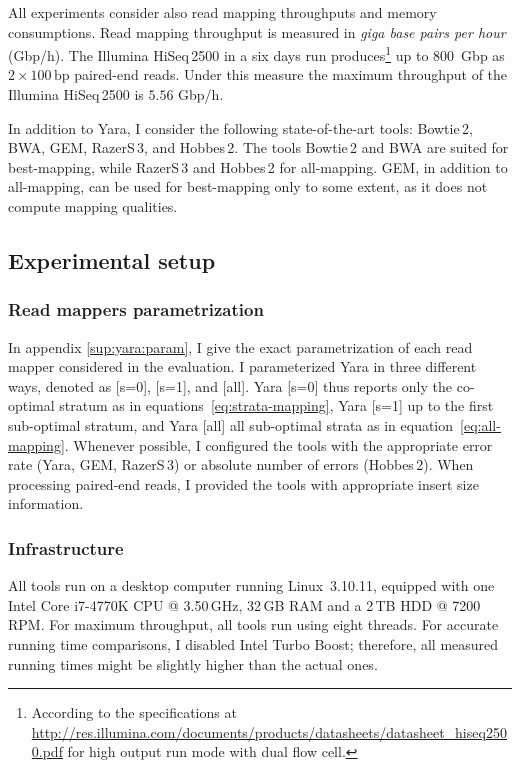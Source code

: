 All experiments consider also read mapping throughputs and memory consumptions.
Read mapping throughput is measured in \emph{giga base pairs per hour} (Gbp/h).
The Illumina HiSeq\,2500 in a six days run produces\footnote{According to the specifications at \url{http://res.illumina.com/documents/products/datasheets/datasheet_hiseq2500.pdf} for high output run mode with dual flow cell.} up to 800~Gbp as $2 \times 100\,\text{bp}$ paired-end reads.
Under this measure the maximum throughput of the Illumina HiSeq\,2500 is $5.56$ Gbp/h.

In addition to Yara, I consider the following state-of-the-art tools: Bowtie\,2, BWA, GEM, RazerS\,3, and Hobbes\,2.
The tools Bowtie\,2 and BWA are suited for best-mapping, while RazerS\,3 and Hobbes\,2 for all-mapping.
GEM, in addition to all-mapping, can be used for best-mapping only to some extent, as it does not compute mapping qualities.

\subsection{Experimental setup}

\subsubsection{Read mappers parametrization}

In appendix \ref{sup:yara:param}, I give the exact parametrization of each read mapper considered in the evaluation.
I parameterized Yara in three different ways, denoted as [s=0], [s=1], and [all].
Yara [s=0] thus reports only the co-optimal stratum as in equations~\ref{eq:strata-mapping}, Yara [s=1] up to the first sub-optimal stratum, and Yara [all] all sub-optimal strata as in equation~\ref{eq:all-mapping}.
Whenever possible, I configured the tools with the appropriate error rate (Yara, GEM, RazerS\,3) or absolute number of errors (Hobbes\,2).
When processing paired-end reads, I provided the tools with appropriate insert size information.

\subsubsection{Infrastructure}

All tools run on a desktop computer running Linux~3.10.11, equipped with one Intel\textsuperscript{\textregistered} Core i7-4770K CPU @ 3.50\,GHz, 32\,GB RAM and a 2\,TB HDD @ 7200\,RPM.
For maximum throughput, all tools run using eight threads.
For accurate running time comparisons, I disabled Intel Turbo Boost; therefore, all measured running times might be slightly higher than the actual ones.

